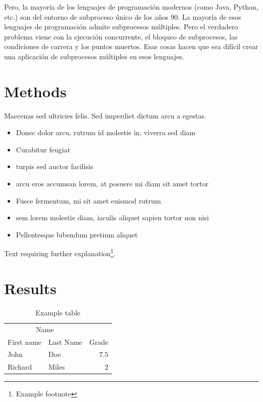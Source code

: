 \documentclass[twoside,twocolumn]{article}
\begin{document}
Pero, la mayoría de los lenguajes de programación modernos (como Java, Python, etc.) son del entorno de subproceso único de los años 90. La mayoría de esos lenguajes de programación admite subprocesos múltiples. Pero el verdadero problema viene con la ejecución concurrente, el bloqueo de subprocesos, las condiciones de carrera y los puntos muertos. Esas cosas hacen que sea difícil crear una aplicación de subprocesos múltiples en esos lenguajes.





\section{Methods}

Maecenas sed ultricies felis. Sed imperdiet dictum arcu a egestas. 
\begin{itemize}
\item Donec dolor arcu, rutrum id molestie in, viverra sed diam
\item Curabitur feugiat
\item turpis sed auctor facilisis
\item arcu eros accumsan lorem, at posuere mi diam sit amet tortor
\item Fusce fermentum, mi sit amet euismod rutrum
\item sem lorem molestie diam, iaculis aliquet sapien tortor non nisi
\item Pellentesque bibendum pretium aliquet
\end{itemize}
\blindtext %

Text requiring further explanation\footnote{Example footnote}.


\section{Results}

\begin{table}
\caption{Example table}
\centering
\begin{tabular}{llr}
\toprule
\multicolumn{2}{c}{Name} \\
\cmidrule(r){1-2}
First name & Last Name & Grade \\
\midrule
John & Doe & $7.5$ \\
Richard & Miles & $2$ \\
\bottomrule
\end{tabular}
\end{table}
\end{document}
